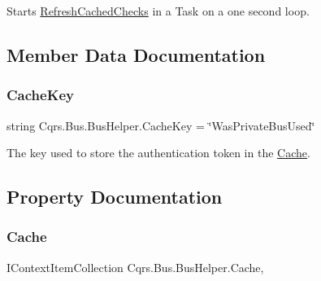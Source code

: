 Starts \hyperlink{classCqrs_1_1Bus_1_1BusHelper_ad589391a51cd61673d2403ee8012e713_ad589391a51cd61673d2403ee8012e713}{Refresh\+Cached\+Checks} in a Task on a one second loop. 



\subsection{Member Data Documentation}
\mbox{\label{classCqrs_1_1Bus_1_1BusHelper_a3777deb7ef63b54f57d45a31df157738_a3777deb7ef63b54f57d45a31df157738}} 
\subsubsection{\texorpdfstring{Cache\+Key}{CacheKey}}
{\footnotesize\ttfamily string Cqrs.\+Bus.\+Bus\+Helper.\+Cache\+Key = \char`\"{}Was\+Private\+Bus\+Used\char`\"{}\hspace{0.3cm}{\ttfamily [protected]}}



The key used to store the authentication token in the \hyperlink{namespaceCqrs_1_1Cache}{Cache}. 



\subsection{Property Documentation}
\mbox{\label{classCqrs_1_1Bus_1_1BusHelper_aa4cbe005c60386ba143fe84afe53d694_aa4cbe005c60386ba143fe84afe53d694}} 
\subsubsection{\texorpdfstring{Cache}{Cache}}
{\footnotesize\ttfamily I\+Context\+Item\+Collection Cqrs.\+Bus.\+Bus\+Helper.\+Cache\hspace{0.3cm}{\ttfamily [get]}, {\ttfamily [protected]}}



